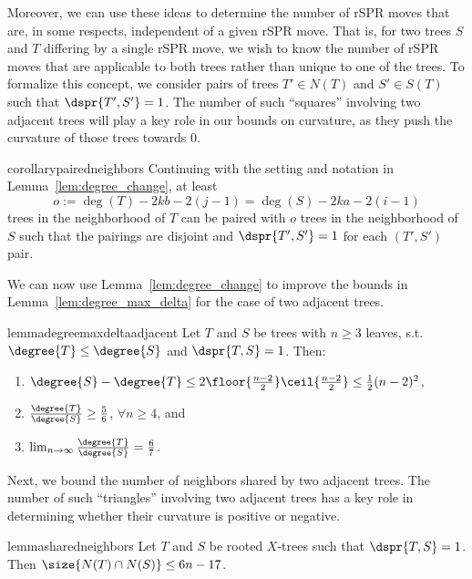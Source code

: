 \documentclass[11pt,onecolumn,conference]{IEEEtran}
\newcommand{\cuttable}[2][]{%
    \ifthenelse{\equal{#1}{}}%
		{}%
		{#1}%
}
\begin{document}
Moreover, we can use these ideas to determine the number of rSPR moves that are, in some respects, independent of a given rSPR move.
That is, for two trees $S$ and $T$ differing by a single rSPR move, we wish to know the number of rSPR moves that are applicable to both trees rather than unique to one of the trees.
To formalize this concept, we consider pairs of trees $T' \in N(T)$ and $S' \in S(T)$ such that $\dspr{T',S'} = 1$.
The number of such ``squares'' involving two adjacent trees will play a key role in our bounds on curvature, as they push the curvature of those trees towards 0.

\begin{restatable}{corollary}{pairedneighbors}
\label{cor:paired_neighbors}
Continuing with the setting and notation in Lemma~\ref{lem:degree_change}, at least
$$o := \deg(T) - 2kb - 2(j-1) = \deg(S) - 2ka - 2(i-1)$$
trees in the neighborhood of $T$ can be paired with $o$ trees in the neighborhood of $S$ such that the pairings are disjoint and $\dspr{T',S'} = 1$ for each $(T',S')$ pair.
\end{restatable}

We can now use Lemma~\ref{lem:degree_change} to improve the bounds in Lemma~\ref{lem:degree_max_delta} for the case of two adjacent trees.
\begin{restatable}{lemma}{degreemaxdeltaadjacent}
	\label{lem:degree_max_delta_adjacent}
	Let $T$ and $S$ be trees with $n \ge 3$ leaves, s.t. $\degree{T} \le \degree{S}$ and $\dspr{T,S} = 1$.
	Then:
	\begin{enumerate}
		\item $\degree{S} - \degree{T} \le 2\floor{\frac{n-2}{2}}\ceil{\frac{n-2}{2}} \le \frac{1}{2} (n-2)^2 $,
		\item $\frac{\degree{T}}{\degree{S}} \ge \frac{5}{6}$, $\forall n \ge 4$, and
		\item $\lim_{n\rightarrow\infty}\frac{\degree{T}}{\degree{S}} =  \frac{6}{7}$.
	\end{enumerate}
\end{restatable}


Next, we bound the number of neighbors shared by two adjacent trees.
The number of such ``triangles'' involving two adjacent trees has a key role in determining whether \cuttable[their]{the} curvature \cuttable{of two adjacent trees }is positive or negative.

\begin{restatable}{lemma}{sharedneighbors}
	\label{lem:shared_neighbors}
Let $T$ and $S$ be rooted $X$-trees such that $\dspr{T,S} = 1$.
Then $\size{N(T) \cap N(S)} \le 6n - 17$.
\end{restatable}
\end{document}
